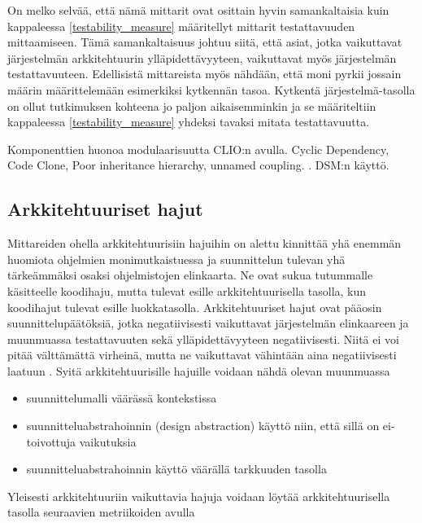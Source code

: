 \documentclass[finnish]{tktltiki2}
\theoremstyle{definition}
\theoremstyle{remark}
\begin{document}
On melko selvää, että nämä mittarit ovat osittain hyvin samankaltaisia kuin kappaleessa \ref{testability_measure} määritellyt mittarit testattavuuden mittaamiseen. Tämä samankaltaisuus johtuu siitä, että asiat, jotka vaikuttavat järjestelmän arkkitehtuurin ylläpidettävyyteen, vaikuttavat myös järjestelmän testattavuuteen. Edellisistä mittareista myös nähdään, että moni pyrkii jossain määrin määrittelemään esimerkiksi kytkennän tasoa. Kytkentä järjestelmä-tasolla on ollut tutkimuksen kohteena jo paljon aikaisemminkin \citep{Rosane:1981} ja se määriteltiin kappaleessa \ref{testability_measure} yhdeksi tavaksi mitata testattavuutta. 

Komponenttien huonoa modulaarisuutta CLIO:n avulla. Cyclic Dependency, Code Clone, Poor inheritance hierarchy, unnamed coupling. \citep{wong_detecting_2011}. DSM:n käyttö. 

\subsection{Arkkitehtuuriset hajut}

Mittareiden ohella arkkitehtuurisiin hajuihin on alettu kinnittää yhä enemmän huomiota ohjelmien monimutkaistuessa ja suunnittelun tulevan yhä tärkeämmäksi osaksi ohjelmistojen elinkaarta. Ne ovat sukua tutummalle käsitteelle koodihaju, mutta tulevat esille arkkitehtuurisella tasolla, kun koodihajut tulevat esille luokkatasolla. Arkkitehtuuriset hajut ovat pääosin suunnittelupäätöksiä, jotka negatiivisesti vaikuttavat järjestelmän elinkaareen ja muunmuassa testattavuuten sekä ylläpidettävyyteen negatiivisesti. Niitä ei voi pitää välttämättä virheinä, mutta ne vaikuttavat vähintään aina negatiivisesti laatuun \citep{de_andrade_architectural_2014}. Syitä arkkitehtuurisille hajuille voidaan nähdä olevan muunmuassa 

\begin{itemize}
	\item suunnittelumalli väärässä kontekstissa
	\item suunnitteluabstrahoinnin (design abstraction) käyttö niin, että sillä on ei-toivottuja vaikutuksia
	\item suunnitteluabstrahoinnin käyttö väärällä tarkkuuden tasolla 
\end{itemize} 


Yleisesti arkkitehtuuriin vaikuttavia hajuja voidaan löytää arkkitehtuurisella tasolla seuraavien metriikoiden avulla \citep[s. 1093]{bertran_detecting_2011}
\end{document}
